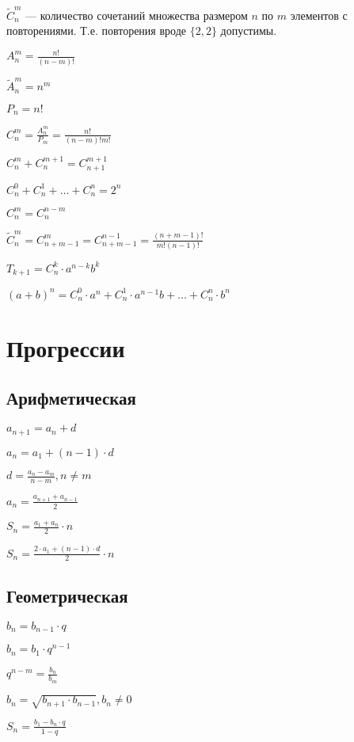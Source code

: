 $ \widetilde{C}^m_n $ --- количество сочетаний множества размером $n$ по $m$ элементов с повторениями. Т.е. повторения вроде $ \{2, 2\} $ допустимы.

$ A^m_n = \frac{n!}{(n-m)!} $

$ \widetilde{A}^m_n = n^m $

$ P_n = n! $

$ C^m_n = \frac{A^m_n}{P_m} = \frac{n!}{(n-m)!m!} $

$ C^m_n + C^{m+1}_n = C^{m+1}_{n+1} $

$ C^0_n + C^1_n + \dots + C^n_n = 2^n $

$ C^m_n = C^{n-m}_n $

$ \widetilde{C}^m_n = C^m_{n+m-1} = C^{n-1}_{n+m-1} = \frac{(n+m-1)!}{m!(n-1)!} $

$ T_{k+1} = C^k_n\cdot a^{n-k}b^k $

$ (a+b)^n = C^0_n\cdot a^n + C^1_n\cdot a^{n-1}b + \dots + C^n_n\cdot b^n $

	
\section{Прогрессии}

\subsection{Арифметическая}

$ a_{n+1} = a_n + d $

$ a_n = a_1 + (n-1)\cdot d $

$ d = \frac{a_n-a_m}{n-m}, n \neq m $

$ a_n = \frac{a_{n+1} + a_{n-1}}{2} $

$ S_n = \frac{a_1 + a_n}{2}\cdot n $

$ S_n = \frac{2\cdot a_1 + (n-1)\cdot d}{2}\cdot n $

\subsection{Геометрическая}

$ b_n = b_{n-1}\cdot q $

$ b_n = b_1 \cdot q^{n-1} $

$ q^{n-m} = \frac{b_n}{b_m} $

$ b_n = \sqrt{b_{n+1}\cdot b_{n-1}}, b_n \neq 0 $

$ S_n = \frac{b_1 - b_n\cdot q}{1-q} $


